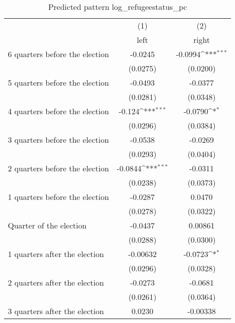 \begin{table}[htbp]\centering
\def\sym#1{\ifmmode^{#1}\else\(^{#1}\)\fi}
\caption{Predicted pattern log\_refugeestatus\_pc}
\begin{tabular}{l*{2}{c}}
\hline\hline
                    &\multicolumn{1}{c}{(1)}&\multicolumn{1}{c}{(2)}\\
                    &\multicolumn{1}{c}{left}&\multicolumn{1}{c}{right}\\
\hline
 6 quarters before the election&     -0.0245         &     -0.0994\sym{***}\\
                    &    (0.0275)         &    (0.0200)         \\
[1em]
 5 quarters before the election&     -0.0493         &     -0.0377         \\
                    &    (0.0281)         &    (0.0348)         \\
[1em]
 4 quarters before the election&      -0.124\sym{***}&     -0.0790\sym{*}  \\
                    &    (0.0296)         &    (0.0384)         \\
[1em]
 3 quarters before the election&     -0.0538         &     -0.0269         \\
                    &    (0.0293)         &    (0.0404)         \\
[1em]
 2 quarters before the election&     -0.0844\sym{***}&     -0.0311         \\
                    &    (0.0238)         &    (0.0373)         \\
[1em]
 1 quarters before the election&     -0.0287         &      0.0470         \\
                    &    (0.0278)         &    (0.0322)         \\
[1em]
Quarter of the election&     -0.0437         &     0.00861         \\
                    &    (0.0288)         &    (0.0300)         \\
[1em]
 1 quarters after the election&    -0.00632         &     -0.0723\sym{*}  \\
                    &    (0.0296)         &    (0.0328)         \\
[1em]
 2 quarters after the election&     -0.0273         &     -0.0681         \\
                    &    (0.0261)         &    (0.0364)         \\
[1em]
 3 quarters after the election&      0.0230         &    -0.00338         \\

\end{tabular}
\end{table}
